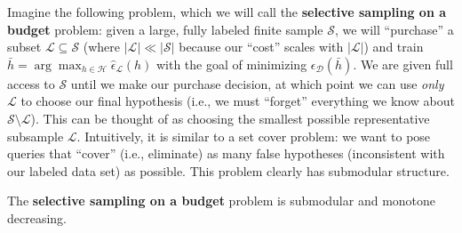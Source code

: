 Imagine the following problem, which we will call the \textbf{selective sampling on a budget} problem: given a large, fully labeled finite sample $\mathcal{S}$, we will ``purchase'' a subset $\mathcal{L} \subseteq \mathcal{S}$ (where $|\mathcal{L}| \ll |\mathcal{S}|$ because our ``cost'' scales with $|\mathcal{L}|$) and train $\bar{h} = \arg\max_{h \in \mathcal{H}} \hat{\epsilon}_{\mathcal{L}}(h)$ with the goal of minimizing $\epsilon_{\mathcal{D}}(\bar{h})$. We are given full access to $\mathcal{S}$ until we make our purchase decision, at which point we can use \textit{only} $\mathcal{L}$ to choose our final hypothesis (i.e., we must ``forget'' everything we know about $\mathcal{S} \setminus \mathcal{L}$). This can be thought of as choosing the smallest possible representative subsample $\mathcal{L}$. Intuitively, it is similar to a set cover problem: we want to pose queries that ``cover'' (i.e., eliminate) as many false hypotheses (inconsistent with our labeled data set) as possible. This problem clearly has submodular structure.

\begin{lemma}\label{lma:ss}
The \textbf{selective sampling on a budget} problem is submodular and monotone decreasing.
\end{lemma}

